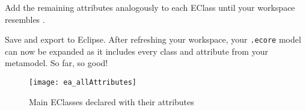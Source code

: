 \begin{stepbystep}
\item Add the remaining attributes analogously to each EClass until your workspace resembles .

\vspace{0.5cm}

\item Save and export to Eclipse. After refreshing your workspace, your \texttt{.ecore} model can now be expanded as it includes
every class and attribute from your metamodel. So far, so good!

\newpage

\vspace*{3cm}

\begin{figure}[htbp]
	\centering
  \texttt{[image: ea\_allAttributes]}
	\caption{Main EClasses declared with their attributes}
	\label{ea:attribute_completed}
\end{figure}
\FloatBarrier

\end{stepbystep}
